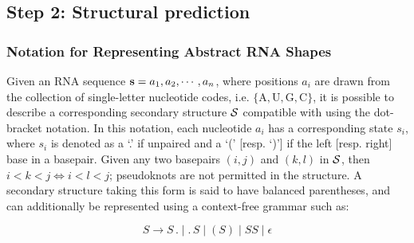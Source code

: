 
\subsection{Step 2: Structural prediction}
\label{subsec:rfinder:strpred}

\subsubsection{Notation for Representing Abstract RNA Shapes}
\label{subsubsec:rfinder:shapes}

Given an RNA sequence ${\bf s} = a_1, a_2, \cdots, a_n$, where positions $a_i$ are drawn from the collection of single-letter nucleotide codes, i.e. $\{\text{A},\text{U},\text{G},\text{C}\}$, it is possible to describe a corresponding secondary structure $\mathcal S$ compatible with \seq using the dot-bracket notation. In this notation, each nucleotide $a_i$ has a corresponding state $s_i$, where $s_i$ is denoted as a `.' if unpaired and a `(' [resp. `)'] if the left [resp. right] base in a basepair. Given any two basepairs $(i,j)$ and $(k,l)$ in $\mathcal S$, then $i < k < j \iff i < l < j$; pseudoknots are not permitted in the structure. A secondary structure taking this form is said to have balanced parentheses, and can additionally be represented using a context-free grammar such as:

\begin{equation} \label{eq:str_cfg}
S \rightarrow S\,.\;|\;.\,S\;|\;(S)\;|\;SS\;|\;\epsilon
\end{equation}

